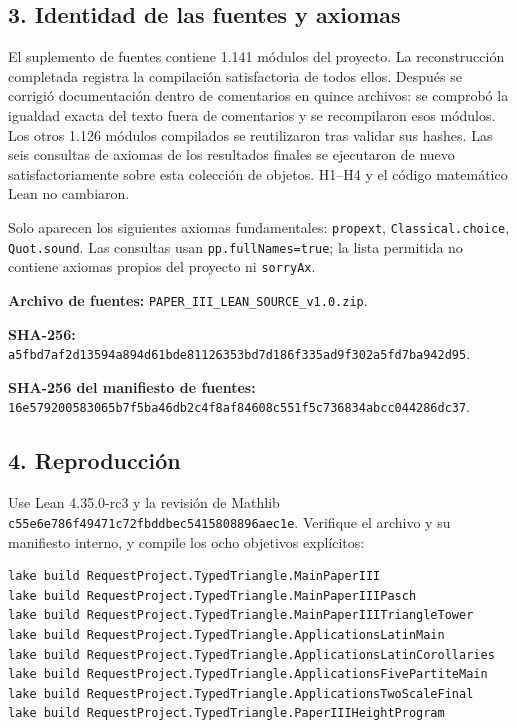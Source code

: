 \documentclass[spanish,11pt,a4paper]{article}
\begin{document}
\subsection{3. Identidad de las fuentes y axiomas}\label{identidad-de-las-fuentes-y-axiomas}

El suplemento de fuentes contiene 1.141 módulos del proyecto. La reconstrucción completada registra la compilación satisfactoria de todos ellos. Después se corrigió documentación dentro de comentarios en quince archivos: se comprobó la igualdad exacta del texto fuera de comentarios y se recompilaron esos módulos. Los otros 1.126 módulos compilados se reutilizaron tras validar sus hashes. Las seis consultas de axiomas de los resultados finales se ejecutaron de nuevo satisfactoriamente sobre esta colección de objetos. H1--H4 y el código matemático Lean no cambiaron.

Solo aparecen los siguientes axiomas fundamentales: \texttt{propext}, \texttt{Classical.\allowbreak{}choice}, \texttt{Quot.\allowbreak{}sound}. Las consultas usan \texttt{pp.\allowbreak{}full\allowbreak{}Names=true}; la lista permitida no contiene axiomas propios del proyecto ni \texttt{sorry\allowbreak{}Ax}.

\textbf{Archivo de fuentes:} \texttt{PAPER\_\allowbreak{}III\_\allowbreak{}LEAN\_\allowbreak{}SOURCE\_\allowbreak{}v1.\allowbreak{}0.\allowbreak{}zip}.

\textbf{SHA-256:} \texttt{a5fbd7af2d13594a\allowbreak{}894d61bde8112635\allowbreak{}3bd7d186f335ad9f\allowbreak{}302a5fd7ba942d95}.

\textbf{SHA-256 del manifiesto de fuentes:}\\
\texttt{16e579200583065b\allowbreak{}7f5ba46db2c4f8af\allowbreak{}84608c551f5c7368\allowbreak{}34abcc044286dc37}.

\subsection{4. Reproducción}\label{reproducciuxf3n}

Use Lean 4.35.0-rc3 y la revisión de Mathlib \texttt{c55e6e786f49471c\allowbreak{}72fbddbec5415808\allowbreak{}896aec1e}. Verifique el archivo y su manifiesto interno, y compile los ocho objetivos explícitos:

\begingroup\scriptsize\begin{verbatim}
lake build RequestProject.TypedTriangle.MainPaperIII
lake build RequestProject.TypedTriangle.MainPaperIIIPasch
lake build RequestProject.TypedTriangle.MainPaperIIITriangleTower
lake build RequestProject.TypedTriangle.ApplicationsLatinMain
lake build RequestProject.TypedTriangle.ApplicationsLatinCorollaries
lake build RequestProject.TypedTriangle.ApplicationsFivePartiteMain
lake build RequestProject.TypedTriangle.ApplicationsTwoScaleFinal
lake build RequestProject.TypedTriangle.PaperIIIHeightProgram
\end{verbatim}\endgroup
\end{document}
